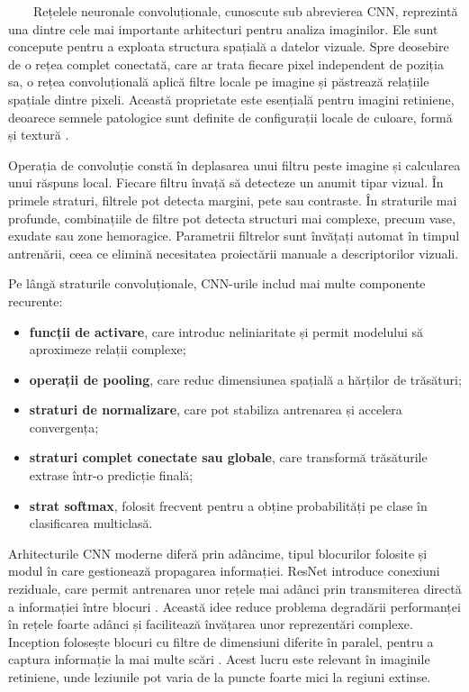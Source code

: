 \documentclass[12pt, a4paper, oneside, romanian]{teza-upb}
\begin{document}
\ \ \ \ Rețelele neuronale convoluționale, cunoscute sub abrevierea CNN, reprezintă una dintre cele mai importante arhitecturi pentru analiza imaginilor. Ele sunt concepute pentru a exploata structura spațială a datelor vizuale. Spre deosebire de o rețea complet conectată, care ar trata fiecare pixel independent de poziția sa, o rețea convoluțională aplică filtre locale pe imagine și păstrează relațiile spațiale dintre pixeli. Această proprietate este esențială pentru imagini retiniene, deoarece semnele patologice sunt definite de configurații locale de culoare, formă și textură \cite{4_pratt2016convolutional}.
\bigskip

Operația de convoluție constă în deplasarea unui filtru peste imagine și calcularea unui răspuns local. Fiecare filtru învață să detecteze un anumit tipar vizual. În primele straturi, filtrele pot detecta margini, pete sau contraste. În straturile mai profunde, combinațiile de filtre pot detecta structuri mai complexe, precum vase, exudate sau zone hemoragice. Parametrii filtrelor sunt învățați automat în timpul antrenării, ceea ce elimină necesitatea proiectării manuale a descriptorilor vizuali.
\bigskip

Pe lângă straturile convoluționale, CNN-urile includ mai multe componente recurente:

\begin{itemize}
  \item \textbf{funcții de activare}, care introduc neliniaritate și permit modelului să aproximeze relații complexe;
  \item \textbf{operații de pooling}, care reduc dimensiunea spațială a hărților de trăsături;
  \item \textbf{straturi de normalizare}, care pot stabiliza antrenarea și accelera convergența;
  \item \textbf{straturi complet conectate sau globale}, care transformă trăsăturile extrase într-o predicție finală;
  \item \textbf{strat softmax}, folosit frecvent pentru a obține probabilități pe clase în clasificarea multiclasă.
\end{itemize}
\bigskip

Arhitecturile CNN moderne diferă prin adâncime, tipul blocurilor folosite și modul în care gestionează propagarea informației. ResNet introduce conexiuni reziduale, care permit antrenarea unor rețele mai adânci prin transmiterea directă a informației între blocuri \cite{21_he2016deep}. Această idee reduce problema degradării performanței în rețele foarte adânci și facilitează învățarea unor reprezentări complexe. Inception folosește blocuri cu filtre de dimensiuni diferite în paralel, pentru a captura informație la mai multe scări \cite{22_szegedy2016rethinking}. Acest lucru este relevant în imaginile retiniene, unde leziunile pot varia de la puncte foarte mici la regiuni extinse.
\bigskip
\end{document}
